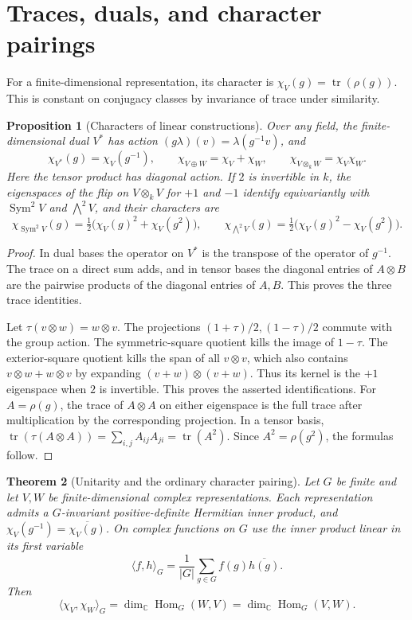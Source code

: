 \documentclass[11pt,oneside,openany]{book}
\newtheorem{theorem}{Theorem}[chapter]
\newtheorem{proposition}[theorem]{Proposition}
\theoremstyle{definition}
\theoremstyle{remark}
\begin{document}
\section{Traces, duals, and character pairings}

For a finite-dimensional representation, its character is
\(\chi_V(g)=\operatorname{tr}(\rho(g))\). This is constant on conjugacy
classes by invariance of trace under similarity.

\begin{proposition}[Characters of linear constructions]
\label{p103:ALG-07-C01-S01}
Over any field, the finite-dimensional dual \(V^*\) has action
\((g\lambda)(v)=\lambda(g^{-1}v)\), and
\[
\chi_{V^*}(g)=\chi_V(g^{-1}),\qquad
\chi_{V\oplus W}=\chi_V+\chi_W,\qquad
\chi_{V\otimes_k W}=\chi_V\chi_W.
\]
Here the tensor product has diagonal action. If \(2\) is invertible in
\(k\), the eigenspaces of the flip on \(V\otimes_k V\) for \(+1\) and
\(-1\) identify equivariantly with \(\operatorname{Sym}^2 V\) and
\(\bigwedge^2 V\), and their characters are
\[
\chi_{\operatorname{Sym}^2 V}(g)
   =\tfrac12\bigl(\chi_V(g)^2+\chi_V(g^2)\bigr),\qquad
\chi_{\bigwedge^2 V}(g)
   =\tfrac12\bigl(\chi_V(g)^2-\chi_V(g^2)\bigr).
\]
\end{proposition}

\begin{proof}
In dual bases the operator on \(V^*\) is the transpose of the operator
of \(g^{-1}\). The trace on a direct sum adds, and in tensor bases the
diagonal entries of \(A\otimes B\) are the pairwise products of the
diagonal entries of \(A,B\). This proves the three trace identities.

Let \(\tau(v\otimes w)=w\otimes v\). The projections
\((1+\tau)/2,(1-\tau)/2\) commute with the group action. The
symmetric-square quotient kills the image of \(1-\tau\).
The exterior-square quotient kills the span of all \(v\otimes v\),
which also contains \(v\otimes w+w\otimes v\) by expanding
\((v+w)\otimes(v+w)\). Thus its kernel is the \(+1\) eigenspace
when \(2\) is invertible. This proves the asserted identifications.
For \(A=\rho(g)\), the trace of \(A\otimes A\) on either eigenspace
is the full trace after multiplication by the corresponding
projection. In a tensor basis,
\(\operatorname{tr}(\tau(A\otimes A))=\sum_{i,j} A_{ij}A_{ji}
=\operatorname{tr}(A^2)\).
Since \(A^2=\rho(g^2)\), the formulas follow.
\end{proof}

\begin{theorem}[Unitarity and the ordinary character pairing]
\label{p103:ALG-07-C02-R01}
Let \(G\) be finite and let \(V,W\) be finite-dimensional complex
representations. Each representation admits a \(G\)-invariant
positive-definite Hermitian inner product, and
\(\chi_V(g^{-1})=\overline{\chi_V(g)}\). On complex functions on \(G\)
use the inner product linear in its first variable
\[
 \langle f,h\rangle_G=\frac1{|G|}\sum_{g\in G}f(g)\overline{h(g)}.
\]
Then
\[
 \langle\chi_V,\chi_W\rangle_G
 =\dim_{\mathbb C}\operatorname{Hom}_G(W,V)
 =\dim_{\mathbb C}\operatorname{Hom}_G(V,W).
\]
\end{theorem}
\end{document}
